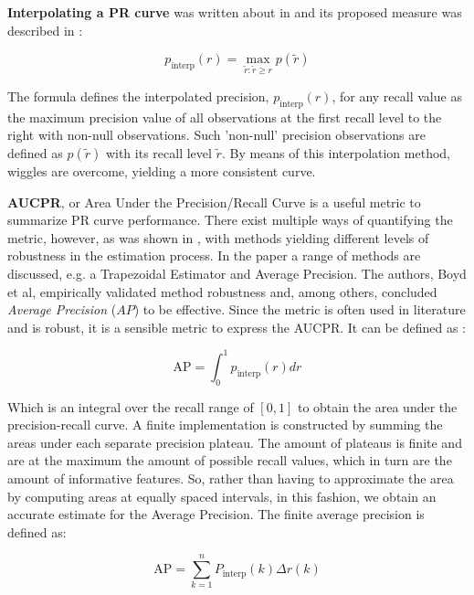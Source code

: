 \documentclass{article}
\begin{document}
\textbf{Interpolating a PR curve} was written about in \citep{10.5555/576628} and its proposed measure was described in \citep{everingham2010pascal}:

\begin{equation}
p_{\text{interp}}(r)=\max_{\tilde{r}: \tilde{r} \geq r} p(\tilde{r})
\end{equation}

The formula defines the interpolated precision, $p_{\text{interp}}(r)$, for any recall value as the maximum precision value of all observations at the first recall level to the right with non-null observations. Such 'non-null' precision observations are defined as $p(\tilde{r})$ with its recall level $\tilde{r}$. By means of this interpolation method, wiggles are overcome, yielding a more consistent curve.

\textbf{AUCPR}, or Area Under the Precision/Recall Curve is a useful metric to summarize PR curve performance. There exist multiple ways of quantifying the metric, however, as was shown in \citep{boyd2013area}, with methods yielding different levels of robustness in the estimation process. In the paper a range of methods are discussed, e.g. a Trapezoidal Estimator and Average Precision. The authors, Boyd et al, empirically validated method robustness and, among others, concluded \textit{Average Precision} ($AP$) to be effective. Since the metric is often used in literature and is robust, it is a sensible metric to express the AUCPR. It can be defined as \citep{zhu2004recall}:

\begin{equation}
\mathrm{AP} = \int_{0}^{1} p_{\text{interp}}(r) d r
\end{equation}

Which is an integral over the recall range of $[0, 1]$ to obtain the area under the precision-recall curve. A finite implementation is constructed by summing the areas under each separate precision plateau. The amount of plateaus is finite and are at the maximum the amount of possible recall values, which in turn are the amount of informative features. So, rather than having to approximate the area by computing areas at equally spaced intervals, in this fashion, we obtain an accurate estimate for the Average Precision. The finite average precision is defined as:

\begin{equation}
\mathrm{AP}=\sum_{k=1}^{n} P_{\text{interp}}(k) \Delta r(k)
\end{equation}
\end{document}
